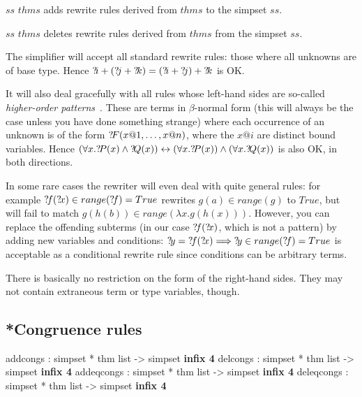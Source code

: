 \begin{ttdescription}
  
\item[$ss$ \ttindexbold{addsimps} $thms$] adds rewrite rules derived
  from $thms$ to the simpset $ss$.
  
\item[$ss$ \ttindexbold{delsimps} $thms$] deletes rewrite rules
  derived from $thms$ from the simpset $ss$.

\end{ttdescription}

\begin{warn}
  The simplifier will accept all standard rewrite rules: those where
  all unknowns are of base type.  Hence ${{?\!i}+({?\!j}+{?\!k})} =
  {({?\!i}+{?\!j})+{?\!k}}$ is OK.
  
  It will also deal gracefully with all rules whose left-hand sides
  are so-called {\em higher-order patterns}~\cite{nipkow-patterns}.
  These are terms in $\beta$-normal form (this will always be the case
  unless you have done something strange) where each occurrence of an
  unknown is of the form ${?\!F}(x@1,\dots,x@n)$, where the $x@i$ are
  distinct bound variables. Hence $(\forall x.{?\!P}(x) \land
  {?\!Q}(x)) \leftrightarrow (\forall x.{?\!P}(x)) \land (\forall
  x.{?\!Q}(x))$ is also OK, in both directions.
  
  In some rare cases the rewriter will even deal with quite general
  rules: for example ${{?\!f}({?\!x})\in range({?\!f})} = True$
  rewrites $g(a) \in range(g)$ to $True$, but will fail to match
  $g(h(b)) \in range(\lambda x.g(h(x)))$.  However, you can replace
  the offending subterms (in our case ${?\!f}({?\!x})$, which is not
  a pattern) by adding new variables and conditions: ${?\!y} =
  {?\!f}({?\!x}) \Longrightarrow {?\!y}\in range({?\!f}) = True$ is
  acceptable as a conditional rewrite rule since conditions can be
  arbitrary terms.
  
  There is basically no restriction on the form of the right-hand
  sides.  They may not contain extraneous term or type variables,
  though.
\end{warn}


\subsection{*Congruence rules}\label{sec:simp-congs}
\begin{ttbox}
addcongs   : simpset * thm list -> simpset \hfill{\bf infix 4}
delcongs   : simpset * thm list -> simpset \hfill{\bf infix 4}
addeqcongs : simpset * thm list -> simpset \hfill{\bf infix 4}
deleqcongs : simpset * thm list -> simpset \hfill{\bf infix 4}
\end{ttbox}

